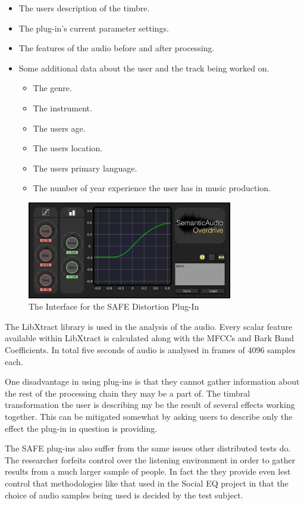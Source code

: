 			\begin{itemize}
				\item The users description of the timbre.
				\item The plug-in's current parameter settings.
				\item The features of the audio before and after processing.
				\item Some additional data about the user and the track being worked on.
				\begin{itemize}
					\item The genre.
					\item The instrument.
					\item The users age.
					\item The users location.
					\item The users primary language.
					\item The number of year experience the user has in music production.
				\end{itemize}
			\end{itemize}

			\begin{figure}[h!]
				\centering
				\includegraphics[width=0.8\textwidth]{chapter4/Images/SAFEDistortion.png}
				\caption{The Interface for the SAFE Distortion Plug-In}
				\label{fig:SAFE-Distortion}
			\end{figure}

			The LibXtract library \citep{bullock2007libxtract} is used in the analysis of the audio. Every
			scalar feature available within LibXtract is calculated along with the MFCCs and Bark Band
			Coefficients. In total five seconds of audio is analysed in frames of 4096 samples each.


			One disadvantage in using plug-ins is that they cannot gather information about the rest of the
			processing chain they may be a part of. The timbral transformation the user is describing my be the
			result of several effects working together. This can be mitigated somewhat by asking users to
			describe only the effect the plug-in in question is providing.

			The SAFE plug-ins also suffer from the same issues other distributed tests do. The researcher
			forfeits control over the listening environment in order to gather results from a much larger sample
			of people. In fact the they provide even lest control that methodologies like that used in the
			Social EQ project \citep{cartwright2013socialeq} in that the choice of audio samples being used is
			decided by the test subject. 
